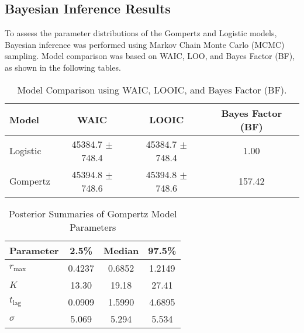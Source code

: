 \documentclass{article}
\begin{document}
\subsection{Bayesian Inference Results}

To assess the parameter distributions of the Gompertz and Logistic models, Bayesian inference was performed using Markov Chain Monte Carlo (MCMC) sampling. Model comparison was based on WAIC, LOO, and Bayes Factor (BF), as shown in the following tables.
\FloatBarrier
\begin{table}[h]
    \centering
    \caption{Model Comparison using WAIC, LOOIC, and Bayes Factor (BF).}
    \label{tab:bayes_comparison}
    \begin{tabular}{lccc}
        \hline
        \textbf{Model} & \textbf{WAIC} & \textbf{LOOIC} & \textbf{Bayes Factor (BF)} \\
        \hline
        Logistic & 45384.7 $\pm$ 748.4 & 45384.7 $\pm$ 748.4 & 1.00 \\
        Gompertz & 45394.8 $\pm$ 748.6 & 45394.8 $\pm$ 748.6 & 157.42 \\
        \hline
    \end{tabular}
\end{table}


\FloatBarrier
\vspace{-0.5cm} %
\begin{table}[h]
    \centering
    \caption{Posterior Summaries of Gompertz Model Parameters}
    \label{tab:bayesian_parameters_gompertz}
    \renewcommand{\arraystretch}{1.2}
    \setlength{\tabcolsep}{6pt}
    \small
    \begin{tabular}{lccc}
        \hline
        \textbf{Parameter} & \textbf{2.5\%} & \textbf{Median} & \textbf{97.5\%} \\
        \hline
        $r_{\max}$  & 0.4237  & 0.6852  & 1.2149 \\
        $K$         & 13.30   & 19.18   & 27.41  \\
        $t_{\text{lag}}$ & 0.0909  & 1.5990  & 4.6895 \\
        $\sigma$    & 5.069   & 5.294   & 5.534  \\
        \hline
    \end{tabular}
\end{table}
\end{document}
